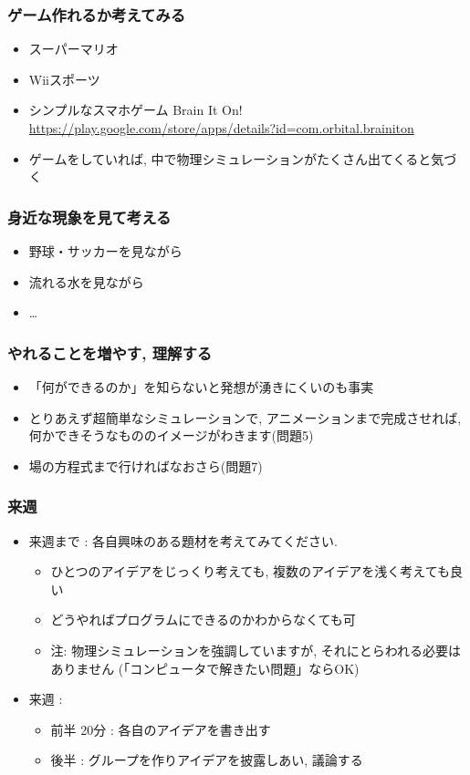 \documentclass[12pt,dvipdfmx]{beamer}
\begin{document}
\begin{frame}
  \frametitle{ゲーム作れるか考えてみる}
  \begin{itemize}
  \item スーパーマリオ
  \item Wiiスポーツ
  \item シンプルなスマホゲーム Brain It On!
    \url{https://play.google.com/store/apps/details?id=com.orbital.brainiton}
  \item ゲームをしていれば,
    中で物理シミュレーションがたくさん出てくると気づく
  \end{itemize}
\end{frame}

\begin{frame}
  \frametitle{身近な現象を見て考える}
  \begin{itemize}
  \item 野球・サッカーを見ながら
  \item 流れる水を見ながら
  \item \ldots
  \end{itemize}
\end{frame}

\begin{frame}
  \frametitle{やれることを増やす, 理解する}
  \begin{itemize}
  \item 「何ができるのか」を知らないと発想が湧きにくいのも事実
  \item とりあえず超簡単なシミュレーションで,
    アニメーションまで完成させれば,
    何かできそうなもののイメージがわきます(問題5)
  \item 場の方程式まで行ければなおさら(問題7)
  \end{itemize}
\end{frame}

\begin{frame}
  \frametitle{来週}
  \begin{itemize}
  \item 来週まで : 各自興味のある題材を考えてみてください.
    \begin{itemize}
    \item ひとつのアイデアをじっくり考えても, 複数のアイデアを浅く考えても良い
    \item どうやればプログラムにできるのかわからなくても可
    \item 注: 物理シミュレーションを強調していますが,
      それにとらわれる必要はありません
      (「コンピュータで解きたい問題」ならOK)
    \end{itemize}
  \item 来週 :
    \begin{itemize}
    \item 前半 20分 : 各自のアイデアを書き出す
     \item 後半 : グループを作りアイデアを披露しあい, 議論する
    \end{itemize}
  \end{itemize}
\end{frame}
\end{document}
